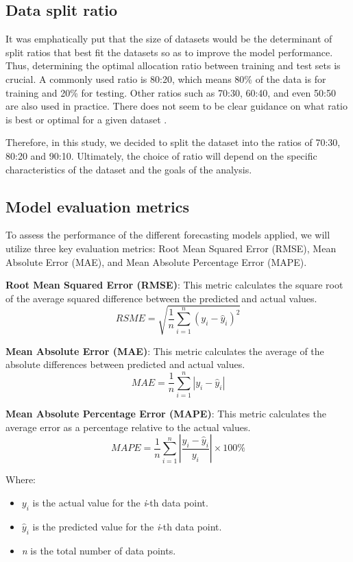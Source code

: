 \documentclass[conference]{IEEEtran}
\begin{document}
\subsection{Data split ratio}
It was emphatically put that the size of datasets would be the determinant of split ratios that best fit the datasets so as to improve the model performance. Thus, determining the optimal allocation ratio between training and test sets is crucial. A commonly used ratio is 80:20, which means 80\% of the data is for training and 20\% for testing. Other ratios such as 70:30, 60:40, and even 50:50 are also used in practice. There does not seem to be clear guidance on what ratio is best or optimal for a given dataset \cite{b8}.\par
Therefore, in this study,  we decided to split the dataset into the ratios of  70:30, 80:20 and 90:10.  Ultimately, the choice of ratio will depend on the specific characteristics of the dataset and the goals of the analysis.

\subsection{Model evaluation metrics}
To assess the performance of the different forecasting models applied, we will utilize three key evaluation metrics: Root Mean Squared Error (RMSE), Mean Absolute Error (MAE), and Mean Absolute Percentage Error (MAPE).\par
\textbf{Root Mean Squared Error (RMSE)}: This metric calculates the square root of the average squared difference between the predicted and actual values.
\begin{equation}\label{eq_rmse}
RSME = \sqrt{\frac{1}{n}\sum_{i=1}^{n}(y_i - \hat{y}_i)^2}
\end{equation}\par
\textbf{Mean Absolute Error (MAE)}: This metric calculates the average of the absolute differences between predicted and actual values.
\begin{equation}\label{eq_mae}
MAE = \frac{1}{n}\sum_{i=1}^{n}|y_i - \hat{y}_i|
\end{equation}\par
\textbf{Mean Absolute Percentage Error (MAPE)}: This metric calculates the average error as a percentage relative to the actual values.
\begin{equation}\label{eq_mape}
MAPE = \frac{1}{n}\sum_{i=1}^{n}\left|\frac{y_i - \hat{y}_i}{y_i}\right| \times 100\%
\end{equation}\par
Where:\par
\begin{itemize}
    \item \(y_i\) is the actual value for the \textit{i}-th data point.
    \item \(\hat{y}_i\) is the predicted value for the \textit{i}-th data point.
    \item \textit{n} is the total number of data points.
\end{itemize}
\end{document}
